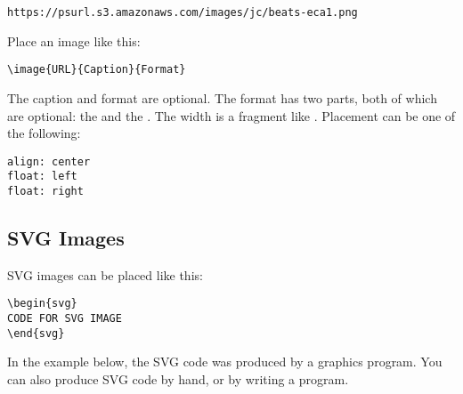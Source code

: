 \begin{verbatim}
https://psurl.s3.amazonaws.com/images/jc/beats-eca1.png
\end{verbatim}

Place an image like this:

\begin{verbatim}
\image{URL}{Caption}{Format}
\end{verbatim}

The caption and format are optional.  The format has two parts, both of which are optional: the  and the . The width is a fragment like .  Placement can be one of the following:

\begin{verbatim}
align: center
float: left
float: right
\end{verbatim}


\subsection{SVG Images}

SVG images can be placed like this:

\begin{verbatim}
\begin{svg}
CODE FOR SVG IMAGE
\end{svg}
\end{verbatim}

In the example below, the SVG code was produced by a graphics program.  You can also produce SVG code by hand, or by writing a program.

